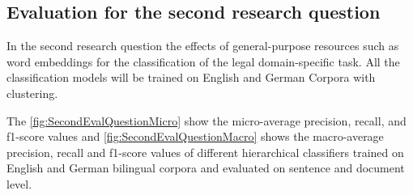 \clearpage


\subsection{Evaluation for the second research question}

In the second research question the effects of general-purpose resources such as word embeddings for the classification of the legal domain-specific task. All the classification models will be trained on English and German Corpora with clustering. 

The \ref{fig:SecondEvalQuestionMicro} show the micro-average precision, recall, and f1-score values and \ref{fig:SecondEvalQuestionMacro} shows the macro-average precision, recall and f1-score values of different hierarchical classifiers trained on English and German bilingual corpora and evaluated on sentence and document level.
\\

